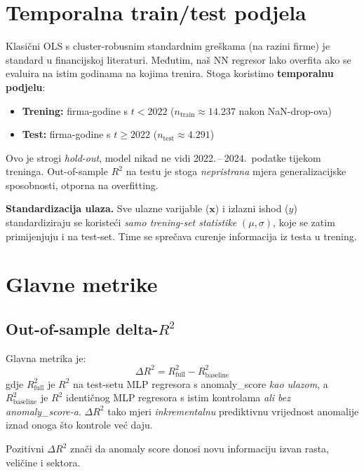 \documentclass[diplomskirad,authoryear]{fer}
\begin{document}
\section{Temporalna train/test podjela}

Klasični OLS s cluster-robusnim standardnim greškama (na razini firme) je standard u financijskoj literaturi. Međutim, naš NN regresor lako overfita ako se evaluira na istim godinama na kojima trenira. Stoga koristimo \textbf{temporalnu podjelu}:

\begin{itemize}
 \item \textbf{Trening:} firma-godine s $t < 2022$ ($n_{\text{train}} \approx 14.237$ nakon NaN-drop-ova)
 \item \textbf{Test:} firma-godine s $t \geq 2022$ ($n_{\text{test}} \approx 4.291$)
\end{itemize}

Ovo je strogi \emph{hold-out}, model nikad ne vidi 2022.\,--\,2024.\ podatke tijekom treninga. Out-of-sample $R^2$ na testu je stoga \emph{nepristrana} mjera generalizacijske sposobnosti, otporna na overfitting.

\textbf{Standardizacija ulaza.} Sve ulazne varijable ($\mathbf{x}$) i izlazni ishod ($y$) standardiziraju se koristeći \emph{samo trening-set statistike} $(\mu, \sigma)$, koje se zatim primijenjuju i na test-set. Time se sprečava curenje informacija iz testa u trening.

\section{Glavne metrike}

\subsection{Out-of-sample delta-$R^2$}

Glavna metrika je:
\begin{equation}
\Delta R^2 = R^2_{\text{full}} - R^2_{\text{baseline}}
\end{equation}
gdje $R^2_{\text{full}}$ je $R^2$ na test-setu MLP regresora s anomaly\_score \emph{kao ulazom}, a $R^2_{\text{baseline}}$ je $R^2$ identičnog MLP regresora s istim kontrolama \emph{ali bez anomaly\_score-a}. $\Delta R^2$ tako mjeri \emph{inkrementalnu} prediktivnu vrijednost anomalije iznad onoga što kontrole već daju.

Pozitivni $\Delta R^2$ znači da anomaly score donosi novu informaciju izvan rasta, veličine i sektora.
\end{document}
